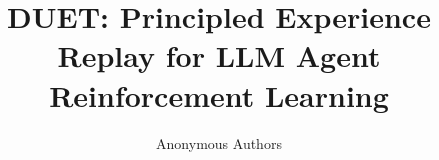 \documentclass{article}
\title{DUET: Principled Experience Replay for LLM Agent Reinforcement Learning}
\author{%
  Anonymous Authors\\
}
\begin{document}
\maketitle























\begin{ack}
\end{ack}


{
\small


}



\appendix




\clearpage

\end{document}
